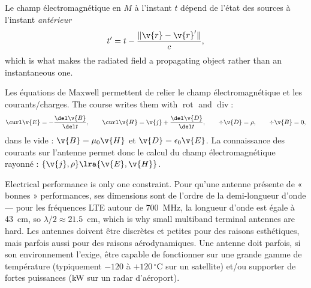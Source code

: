 \begin{figure}[h!]
  \centering
\end{figure}

\begin{remark}
  Le champ électromagnétique en $M$ à l'instant $t$ dépend de l'état des
  sources à l'instant \emph{antérieur}
  \[ t' = t - \frac{\|\v{r} - \v{r}'\|}{c}, \]
  which is what makes the radiated field a propagating object rather than an
  instantaneous one.
\end{remark}

Les équations de Maxwell permettent de relier le champ électromagnétique et les
courants/charges. The course writes them with $\operatorname{rot}$ and
$\operatorname{div}$:
\[
  \curl \v{E} = -\frac{\del \v{B}}{\del t}, \qquad
  \curl \v{H} = \v{j} + \frac{\del \v{D}}{\del t}, \qquad
  \div \v{D} = \rho, \qquad \div \v{B} = 0,
\]
dans le vide : $\v{B} = \mu_0 \v{H}$ et $\v{D} = \epsilon_0 \v{E}$. La
connaissance des courants sur l'antenne permet donc le calcul du champ
électromagnétique rayonné : $\{\v{j}, \rho\} \lra \{\v{E}, \v{H}\}$.

\begin{remark}
  Electrical performance is only one constraint. Pour qu'une antenne présente
  de « bonnes » performances, ses dimensions sont de l'ordre de la
  demi-longueur d'onde --- pour les fréquences LTE autour de 700~MHz, la
  longueur d'onde est égale à 43~cm, so $\lambda/2 \approx 21.5$~cm, which is
  why small multiband terminal antennes are hard. Les antennes doivent être
  discrètes et petites pour des raisons esthétiques, mais parfois aussi pour
  des raisons aérodynamiques. Une antenne doit parfois, si son environnement
  l'exige, être capable de fonctionner sur une grande gamme de température
  (typiquement $-120$ à $+120\,^\circ$C sur un satellite) et/ou supporter de
  fortes puissances (kW sur un radar d'aéroport).
\end{remark}

